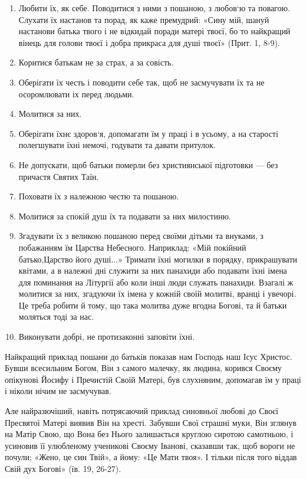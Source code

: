 \documentclass[main.tex]{subfiles}
\begin{document}
\begin{enumerate}
    \item Любити їх, як себе. Поводитися з ними з пошаною, з любов`ю та повагою. Слухати їх настанов та порад, як каже премудрий: «Сину мій, шануй настанови батька твого і не відкидай поради матері твоєї, бо то найкращий вінець для голови твоєї і добра прикраса для душі твоєї» (Прит. 1, 8-9).
    \item Коритися батькам не за страх, а за совість.
    \item Оберігати їх честь і поводити себе так, щоб не
    засмучувати їх та не осоромлювати іх перед людьми.
    \item Молитися за них.
    \item Оберігати їхнє здоров`я, допомагати їм у праці і в усьому, а на старості полегшувати їхні немочі, годувати та давати притулок.
    \item Не допускати, щоб батьки померли без християнської підготовки — без причастя Святих Таїн.
    \item Поховати їх з належною честю та пошаною.
    \item Молитися за спокій душ їх та подавати за них милостиню.
    \item Згадувати їх з великою пошаною перед своїми дітьми та внуками, з побажанням їм Царства Небесного. Наприклад: «Мій покійний батько,Царство його душі...» Тримати їхні могилки в порядку, прикрашувати квітами, а в належні дні служити за них панахиди або подавати їхні імена для поминання на Літургії або коли інші люди служать панахиди. Взагалі ж молитися за них, згадуючи їх імена у кожній своїй молитві, вранці і увечорі. Це треба робити й тому, що така молитва дуже вгодна Богові, та й батьки моляться тоді за нас.
    \item Виконувати добрі, не протизаконні заповіти їхні.
\end{enumerate}

Найкращий приклад пошани до батьків показав нам Господь наш Ісус Христос. Бувши всесильним Богом, Він з самого малечку, як людина, корився Своєму опікунові Йосифу і Пречистій Своїй Матері, був слухняним, допомагав їм у праці і ніколи нічим не засмучував.

Але найразючіший, навіть потрясаючий приклад синовньої любові до Своєї Пресвятої Матері виявив Він на хресті. Забувши Свої страшні муки, Він зглянув на Матір Свою, що Вона без Нього залишається круглою сиротою самотньою, і усиновив її улюбленому ученикові Своєму Іванові, сказавши так, щоб вороги не почули; «Жено, це син Твій», а йому: «Це Мати твоя». І тільки після того віддав Свій дух Богові» (їв. 19, 26-27).
\end{document}
